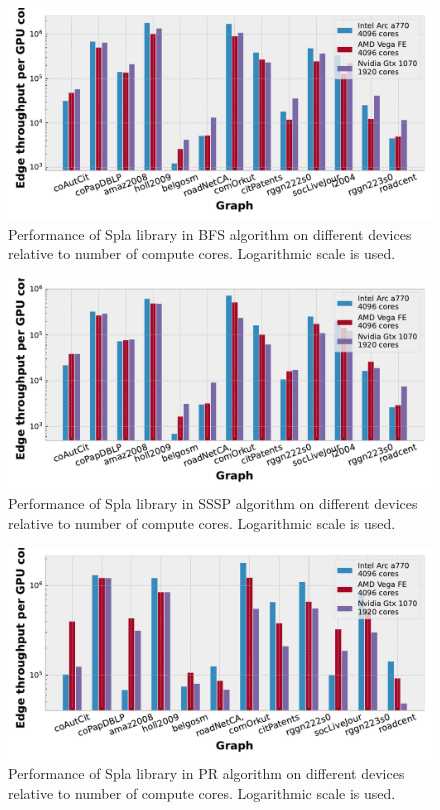 \begin{figure}[]
\centering
\includegraphics[width=0.95\linewidth]{plots/rq2_cores_bfs.pdf}
\caption{Performance of Spla library in BFS algorithm on different devices relative to number of compute cores. Logarithmic scale is used.}
\label{fig:rq_bfs}
\end{figure}

\begin{figure}[]
\centering
\includegraphics[width=0.95\linewidth]{plots/rq2_cores_sssp.pdf}
\caption{Performance of Spla library in SSSP algorithm on different devices relative to number of compute cores. Logarithmic scale is used.}
\label{fig:rq_sssp}
\end{figure}

\begin{figure}[]
\centering
\includegraphics[width=0.95\linewidth]{plots/rq2_cores_pr.pdf}
\caption{Performance of Spla library in PR algorithm on different devices relative to number of compute cores. Logarithmic scale is used.}
\label{fig:rq_pr}
\end{figure}

